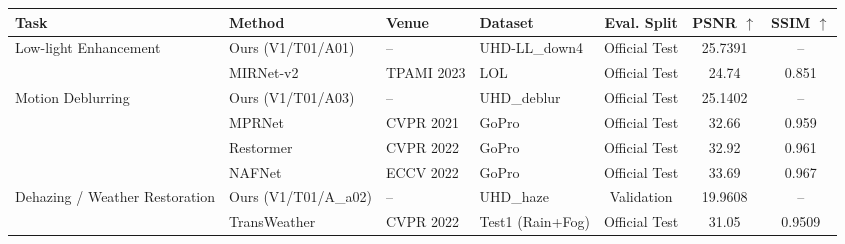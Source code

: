 \documentclass[preview,border=6pt]{standalone}
\begin{document}
\begin{tabular}{llllccc}
\toprule
Task & Method & Venue & Dataset & Eval. Split & PSNR $\uparrow$ & SSIM $\uparrow$ \\
\midrule
Low-light Enhancement
& Ours (V1/T01/A01)
& --
& UHD-LL\_down4
& Official Test
& 25.7391
& -- \\
& MIRNet-v2
& TPAMI 2023
& LOL
& Official Test
& 24.74
& 0.851 \\
\midrule
Motion Deblurring
& Ours (V1/T01/A03)
& --
& UHD\_deblur
& Official Test
& 25.1402
& -- \\
& MPRNet
& CVPR 2021
& GoPro
& Official Test
& 32.66
& 0.959 \\
& Restormer
& CVPR 2022
& GoPro
& Official Test
& 32.92
& 0.961 \\
& NAFNet
& ECCV 2022
& GoPro
& Official Test
& 33.69
& 0.967 \\
\midrule
Dehazing / Weather Restoration
& Ours (V1/T01/A\_a02)
& --
& UHD\_haze
& Validation
& 19.9608
& -- \\
& TransWeather
& CVPR 2022
& Test1 (Rain+Fog)
& Official Test
& 31.05
& 0.9509 \\
\bottomrule
\end{tabular}
\end{document}
